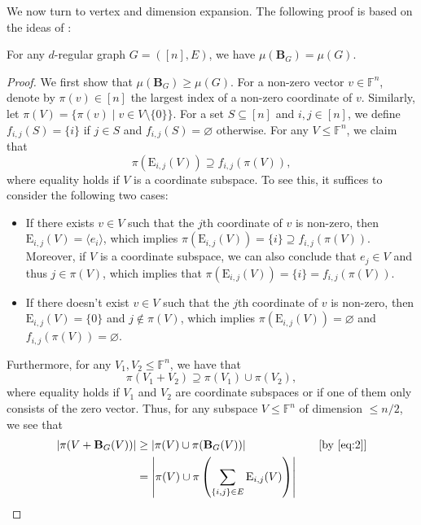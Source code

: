 \documentclass{toc}
\theoremstyle{plain}
\numberwithin{equation}{section}
\theoremstyle{definition}
\newcommand{\F}{\mathbb{F}}
\newcommand{\tuple}[1]{\mathbf{#1}}
\newcommand{\vB}{\tuple{B}}
\newcommand{\E}{\mathrm{E}}
\begin{document}
We now turn to vertex and dimension expansion.
The following proof is based on the ideas of \cite{DS09, DW10}:
\begin{proposition}\label{prop:graphical-vertex}
    For any $d$-regular graph $G=([n],E)$, we have $\mu(\vB_G)=\mu(G)$.
\end{proposition}
\begin{proof}
	We first show that $\mu(\vB_G)\geq \mu(G)$. 
    For a non-zero vector $v \in \mathbb{F}^n$, denote by $\pi(v) \in[n]$ the largest index of a non-zero coordinate of $v$. Similarly, let $\pi(V)=\{\pi(v) \mid v \in V \setminus \{0\}\}$. For a set $S\subseteq[n]$ and $i,j\in[n]$, we define $f_{i,j}(S)=\{i\}$ if $j\in S$ and $f_{i,j}(S)=\varnothing$ otherwise. For any $V\leq\F^{n}$, we claim that
    \begin{equation}\label{eq:1}
        \pi(\E_{i,j}(V))\supseteq f_{i,j}(\pi(V)),
    \end{equation}
    where equality holds if $V$ is a coordinate subspace. To see this, it suffices to consider the following two cases:
    \begin{itemize}
        \item If there exists $v\in V$ such that the $j$th coordinate of $v$ is non-zero, then $\E_{i,j}(V)=\langle e_i\rangle$, which implies $\pi(\E_{i,j}(V))=\{i\}\supseteq f_{i,j}(\pi(V))$. Moreover, if $V$ is a coordinate subspace, we can also conclude that $e_j\in V$ and thus $j\in \pi(V)$, which implies that $\pi(\E_{i,j}(V))=\{i\}= f_{i,j}(\pi(V))$.
        \item If there doesn't exist $v\in V$ such that the $j$th coordinate of $v$ is non-zero, then $\E_{i,j}(V)=\{0\}$ and $j\notin\pi(V)$, which implies $\pi(\E_{i,j}(V))=\varnothing$ and $f_{i,j}(\pi(V))=\varnothing$.
    \end{itemize}
    Furthermore, for any $V_1,V_2\leq \F^n$, we have that
    \begin{equation}\label{eq:2}
        \pi(V_1+ V_2)\supseteq\pi(V_1)\cup\pi(V_2),
    \end{equation}
    where equality holds if $V_1$ and $V_2$ are coordinate subspaces or if one of them only consists of the zero vector. Thus, for any subspace $V\leq\F^n$ of dimension $\leq n/2$, we see that
    \begin{align*}
        |\pi(V+\vB_G(V))|&\geq|\pi(V)\cup\pi(\vB_G(V))|\quad &[\text{by \eqref{eq:2}}]\\
        &=\left|\pi(V)\cup\pi\left(\sum_{\{i,j\}\in E}\E_{i,j}(V)\right)\right|\quad &\\

\end{align*}
\end{proof}
\end{document}
